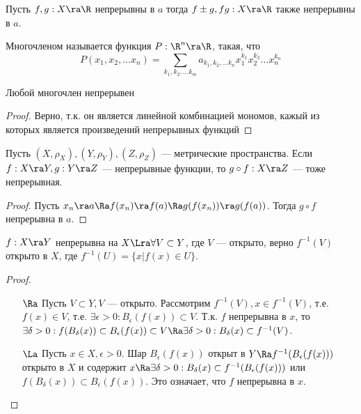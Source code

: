 \begin{corollary}
    Пусть \(f, g: X \ra \R\) непрерывны в \(a\) тогда \(f \pm g, fg: X \ra \R\) также непрерывны в \(a\).
\end{corollary}

\begin{definition}
    Многочленом называется функция \(P: \R^n \ra \R\), такая, что
    \[P(x_1, x_2, \dots x_n) = \sum_{k_1, k_2, \dots k_m} a_{k_1, k_2, \dots k_n}x_1^{k_1}x_2^{k_2}\dots x_n^{k_n}\]
\end{definition}

\begin{example}
    Любой многочлен непрерывен
\end{example}
\begin{proof}
    Верно, т.к. он является линейной комбинацией мономов, кажый из которых является произведений непрерывных функций
\end{proof}

\begin{theorem}
    Пусть \((X, \rho_X), (Y, \rho_Y), (Z, \rho_Z)\) --- метрические пространства. Если \(f: X \ra Y, g: Y \ra Z\) --- непрерывные функции, то \(g \circ f: X \ra Z\) --- тоже непрерывная.
\end{theorem}
\begin{proof}
    Пусть \(x_n \ra a \Ra f(x_n) \ra f(a) \Ra g(f(x_n)) \ra g(f(a))\). Тогда \(g\circ f\) непрерывна в \(a\).
\end{proof}

\begin{theorem}
    \(f: X \ra Y\) непрерывна на \(X \Lra \forall V \subset Y\), где \(V\) --- открыто, верно \(f^{-1}(V)\) открыто в \(X\), где \(f^{-1}(U) = \{x | f(x) \in U\}\).
\end{theorem}
\begin{proof}\indent
    \begin{enumerate}
        \item[\(\Ra\)] Пусть \(V \subset Y, V\) --- открыто. Рассмотрим \(f^{-1}(V), x \in f^{-1}(V)\), т.е. \(f(x) \in V\), т.е. \(\exists \epsilon > 0: B_\epsilon(f(x)) \subset V\). Т.к. \(f\) непрерывна в \(x\), то \(\exists \delta > 0: f(B_\delta(x)) \subset B_\epsilon(f(x)) \subset V \Ra \exists \delta > 0: B_\delta(x) \subset f^{-1}(V)\).
        \item[\(\La\)] Пусть \(x \in X, \epsilon > 0\). Шар \(B_\epsilon(f(x))\) открыт в \(Y \Ra f^{-1}(B_\epsilon(f(x)))\) открыто в \(X\) и содержит \(x \Ra \exists \delta > 0: B_\delta(x) \subset f^{-1}(B_\epsilon(f(x)))\) или \(f(B_\delta(x)) \subset B_\epsilon(f(x))\). Это означает, что \(f\) непрерывна в \(x\).
    \end{enumerate}
\end{proof}

